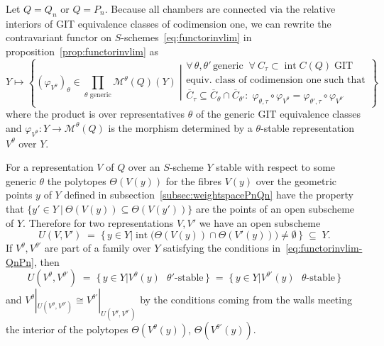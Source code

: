 \documentclass[ALCO,ThmDefs,Unicode,epreuves]{cedram}
\def\phi{\varphi}
\DeclareMathOperator{\interior}{int}
\begin{document}
Let $Q\!=\!Q_n$ or $Q\!=\!P_n$. Because all chambers are connected via the 
relative interiors of GIT equivalence classes of codimension one, we can rewrite 
the contravariant functor on $S$-schemes~\eqref{eq:functorinvlim} in 
proposition~\ref{prop:functorinvlim} as
\begin{equation}\label{eq:functorinvlim-QnPn}
Y\mapsto
\left\{\left.
(\phi_{V^\theta})_\theta\in\!\!\!\!\!\prod_{\text{$\theta$ generic}}\!\!\!\!\!
\mathcal M^\theta(Q)(Y)
\;\right|\!
\begin{array}{l}
\forall\,\theta,\theta'\,\text{generic}\;\;
\forall\:C_\tau\subset\interior C(Q)\;\text{GIT}\\
\text{equiv.\ class of codimension one such that}\\
\overline{C}_\tau\subseteq\overline{C}_\theta\cap\overline{C}_{\theta'}\colon
\;\phi_{\theta,\tau}\circ\phi_{V^{\theta}}=\phi_{\theta',\tau}\circ\phi_{V^{\theta'}}
\end{array}\!
\right\}
\end{equation}
where the product is over representatives $\theta$ of the generic GIT equivalence classes
and $\phi_{V^\theta}\colon Y\to\mathcal M^\theta(Q)$ is the morphism determined by a
$\theta$-stable representation $V^\theta$ over $Y$.


For a representation $V$ of $Q$ over an $S$-scheme $Y$ stable with respect 
to some generic $\theta$ the polytopes $\Theta(V(y))$ for the fibres $V(y)$ 
over the geometric points $y$ of $Y$ defined in subsection~\ref{subsec:weightspacePnQn} 
have the property that $\{y'\in Y\:|\:\Theta(V(y))\subseteq \Theta(V(y'))\}$ are 
the points of an open subscheme of $Y$. Therefore for two representations $V,V'$ 
we have an open subscheme
\[
U(V,V')\;=\;\big\{\,y\in Y \mathbin{\big|}\interior\big(\Theta(V(y))\cap\Theta(V'(y))\big)
\neq\emptyset\,\big\}\;\subseteq \;Y.
\]
If $V^\theta,V^{\theta'}\!$ are part of a family over $Y$ satisfying the conditions
in~\eqref{eq:functorinvlim-QnPn}, then 
\[
U(V^\theta,V^{\theta'})
\;=\;\big\{\,y\in Y\mathbin{\big|}\text{$V^\theta(y)$ $\theta'$-stable}\,\big\}
\;=\;\big\{\,y\in Y\mathbin{\big|}\text{$V^{\theta'}\!(y)$ $\theta$-stable}\,\big\}
\] 
and $V^\theta|_{U(V^\theta,V^{\theta'})}\cong V^{\theta'}|_{U(V^\theta,V^{\theta'})}$
by the conditions coming from the walls meeting the interior of the polytopes
$\Theta(V^\theta(y))$, $\Theta(V^{\theta'}\!(y))$.

\end{document}
